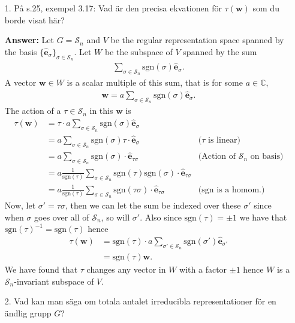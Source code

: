 \documentclass[12pt,a4paper]{article}
\theoremstyle{definition}
\theoremstyle{remark}
\numberwithin{equation}{section}
\newcommand{\CC}{\mathbb{C}}
\newcommand{\1}{\mathbf{1}}
\newcommand{\0}{\mathbf{0}}
\newcommand{\Sym}{\mathcal{S}} %
\newcommand{\sgn}{\text{sgn}}
\newcommand{\bas}{\mathbf{\hat{e}}}
\newcommand{\wvec}{\mathbf{w}}
\begin{document}
	\begin{enumerate}
		\item[1.] På s.25, exempel 3.17: Vad är den precisa ekvationen för $\tau(\wvec)$ som du borde visat här?
			
			\textbf{Answer:} Let $G = \Sym_n$ and $V$ be the regular representation space spanned by the basis $\{\bas_\sigma\}_{\sigma \in \Sym_n}$. Let $W$ be the subspace of $V$ spanned by the sum
			\begin{align*}
				\sum_{\sigma \in \Sym_n} \sgn(\sigma) \bas_\sigma.
			\end{align*}
			A vector $\wvec \in W$ is a scalar multiple of this sum, that is for some $a \in \CC$,
			\begin{align*}
				\wvec = a \sum_{\sigma \in \Sym_n} \sgn(\sigma) \bas_\sigma.
			\end{align*}
			The action of a $\tau \in \Sym_n$ in this $\wvec$ is
			\begin{align*}
				\tau(\wvec) &= \tau \cdot a \sum_{\sigma \in \Sym_n} \sgn(\sigma) \bas_\sigma \\
				&= a \sum_{\sigma \in \Sym_n} \sgn(\sigma) \tau \cdot \bas_\sigma & \text{($\tau$ is linear)} \\
				&= a \sum_{\sigma \in \Sym_n} \sgn(\sigma) \cdot \bas_{\tau\sigma} & \text{(Action of $\Sym_n$ on basis)} \\
				&= a \frac{1}{\sgn(\tau)} \sum_{\sigma \in \Sym_n} \sgn(\tau)\sgn(\sigma) \cdot \bas_{\tau\sigma} \\
				&= a \frac{1}{\sgn(\tau)} \sum_{\sigma \in \Sym_n} \sgn(\tau\sigma) \cdot \bas_{\tau\sigma} & \text{($\sgn$ is a homom.)}
			\end{align*}
			Now, let $\sigma' = \tau\sigma$, then we can let the sum be indexed over these $\sigma'$ since when $\sigma$ goes over all of $\Sym_n$, so will $\sigma'$. Also since $\sgn(\tau) = \pm 1$ we have that $\sgn(\tau)^{-1} = \sgn(\tau)$ hence
			\begin{align*}
				\tau(\wvec) &= \sgn(\tau) \cdot a \sum_{\sigma' \in \Sym_n} \sgn(\sigma') \bas_{\sigma'} \\
				&= \sgn(\tau)\wvec.
			\end{align*}
			We have found that $\tau$ changes any vector in $W$ with a factor $\pm 1$ hence $W$ is a $\Sym_n$-invariant subspace of $V$.
			
		\item[2.] Vad kan man säga om totala antalet irreducibla representationer för en ändlig grupp $G$?
		

\end{enumerate}
\end{document}
